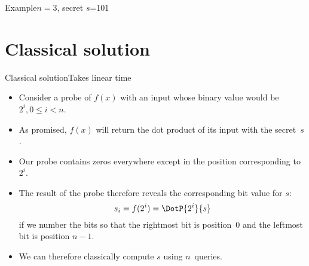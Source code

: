 \begin{frame}{Example}{$n=3$, secret $s$=101}
\end{frame}

\section*{Classical solution}

\begin{frame}{Classical solution}{Takes linear time}

\begin{itemize}
    \item Consider a probe of $f(x)$ with an input whose binary value would be~$2^{i}, 0 \leq i < n$.
    \item As promised, $f(x)$ will return the dot product of its input with the secret~$s$.
    \item Our probe contains zeros everywhere except in the position corresponding to~$2^i$.
    \item The result of the probe therefore reveals the corresponding bit value for $s$:
    \[ s_{i} = f(2^{i}) = \DotP{2^i}{s} \]
    if we number the bits so that the rightmost bit is position~$0$ and the leftmost bit is position $n-1$.
    \item We can therefore classically compute $s$ using $n$~queries.
\end{itemize}
    
\end{frame}

